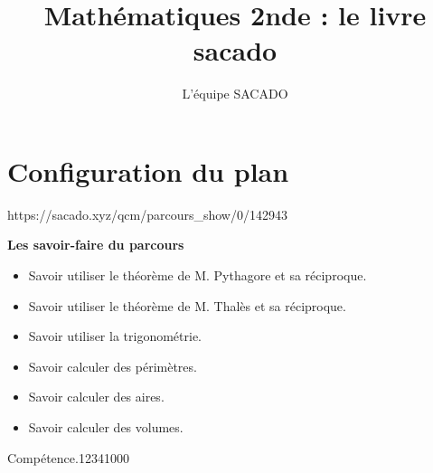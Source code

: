 



\title{Mathématiques 2nde  : le livre sacado}
\author{L'équipe SACADO}




\chapter{Configuration du plan}
{https://sacado.xyz/qcm/parcours_show/0/142943}
{
 \begin{CpsCol}
	\textbf{Les savoir-faire du parcours}
 	\begin{itemize}
 		\item Savoir utiliser le théorème de M. Pythagore et sa réciproque.
		\item Savoir utiliser le théorème de M. Thalès et sa réciproque.
		\item Savoir utiliser la trigonométrie.
		\item Savoir calculer des périmètres.
		\item Savoir calculer des aires.
		\item Savoir calculer des volumes.
 	\end{itemize}
 \end{CpsCol}

\begin{His}
\end{His}

\begin{ExoDec}{Compétence.}{1234}{1}{0}{0}{0}
\end{ExoDec}
}


